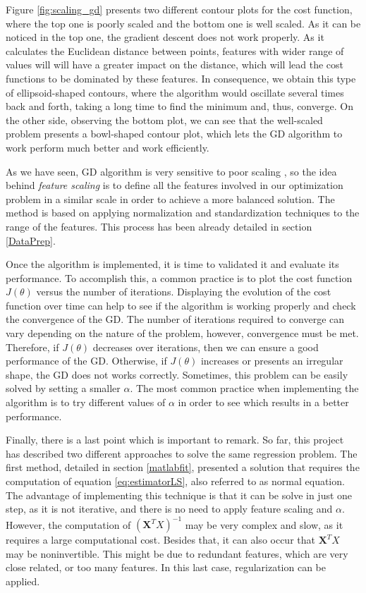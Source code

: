 \documentclass[a4paper, report, oneside, UKenglish]{memoir}
\begin{document}
Figure \ref{fig:scaling_gd} presents two different contour plots for the cost function, where the top one is poorly scaled and the bottom one is well scaled. As it can be noticed in the top one, the gradient descent does not work properly. As it calculates the Euclidean distance between points, features with wider range of values will will have a greater impact on the distance, which will lead the cost functions to be dominated by these features. In consequence, we obtain this type of ellipsoid-shaped contours, where the algorithm would oscillate several times back and forth, taking a long time to find the minimum and, thus, converge. On the other side, observing the bottom plot, we can see that the well-scaled problem presents a bowl-shaped contour plot, which lets the GD algorithm to work perform much better and work efficiently.  

As we have seen, GD algorithm is very sensitive to poor scaling \cite{numericalopt}, so the idea behind \textit{feature scaling} is to define all the features involved in our optimization problem in a similar scale in order to achieve a more balanced solution. The method is based on applying normalization and standardization techniques to the range of the features. This process has been already detailed in section \ref{DataPrep}. 

Once the algorithm is implemented, it is time to validated it and evaluate its performance. To accomplish this, a common practice is to plot the cost function $J(\theta)$ versus the number of iterations. Displaying the evolution of the cost function over time can help to see if the algorithm is working properly and check the convergence of the GD. The number of iterations required to converge can vary depending on the nature of the problem, however, convergence must be met. Therefore, if $J(\theta)$ decreases over iterations, then we can ensure a good performance of the GD. Otherwise, if $J(\theta)$ increases or presents an irregular shape, the GD does not works correctly. Sometimes, this problem can be easily solved by setting a smaller $\alpha$. The most common practice when implementing the algorithm is to try different values of $\alpha$ in order to see which results in a better performance. 

Finally, there is a last point which is important to remark. So far, this project has described two different approaches to solve the same regression problem. The first method, detailed in section \ref{matlabfit}, presented a solution that requires the computation of equation \eqref{eq:estimatorLS}, also referred to as normal equation. The advantage of implementing this technique is that it can be solve in just one step, as it is not iterative, and there is no need to apply feature scaling and $\alpha$. However, the computation of $(\textbf{X}^{T}X)^{-1}$ may be very complex and slow, as it requires a large computational cost. Besides that, it can also occur that $\textbf{X}^{T}X$ may be noninvertible. This might be due to redundant features, which are very close related, or too many features. In this last case, regularization can be applied. 
\end{document}
